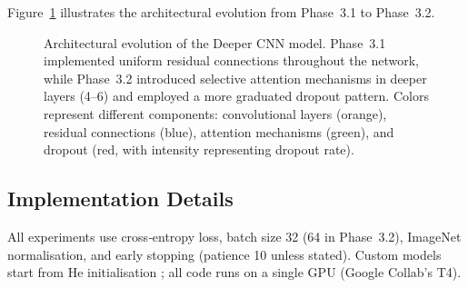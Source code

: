 \noindent
Figure~\ref{fig:deeper_cnn_arch} illustrates the architectural evolution from Phase~3.1 to Phase~3.2.

\begin{figure}[htbp]
    \centering
    \caption{Architectural evolution of the Deeper CNN model. Phase~3.1 implemented uniform residual connections throughout the network, while Phase~3.2 introduced selective attention mechanisms in deeper layers (4--6) and employed a more graduated dropout pattern. Colors represent different components: convolutional layers (orange), residual connections (blue), attention mechanisms (green), and dropout (red, with intensity representing dropout rate).}
    \label{fig:deeper_cnn_arch}
\end{figure}

\subsection{Implementation Details}
\noindent
All experiments use cross‑entropy loss, batch size 32 (64 in Phase~3.2), ImageNet normalisation, and early stopping (patience 10 unless stated). Custom models start from He initialisation \cite{he2015delving}; all code runs on a single GPU (Google Collab's T4).

